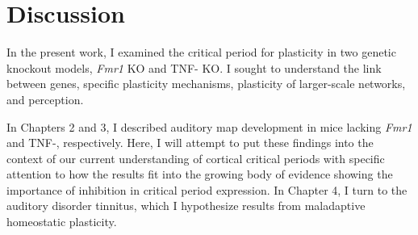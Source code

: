 \chapter{Discussion}
In the present work, I examined the critical period for plasticity in two genetic knockout models, \textit{Fmr1} KO and TNF-\textalpha{} KO. I sought to understand the link between genes, specific plasticity mechanisms, plasticity of larger-scale networks, and perception.

In Chapters 2 and 3, I described auditory map development in mice lacking \textit{Fmr1} and TNF-\textalpha{}, respectively. Here, I will attempt to put these findings into the context of our current understanding of cortical critical periods with specific attention to how the results fit into the growing body of evidence showing the importance of inhibition in critical period expression. In Chapter 4, I turn to the auditory disorder tinnitus, which I hypothesize results from maladaptive homeostatic plasticity.


